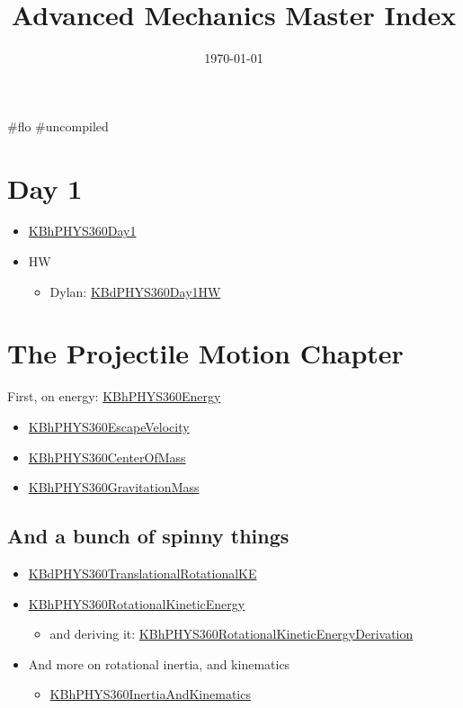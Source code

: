 \documentclass[letterpaper]{article}
\date{\today}
\title{Advanced Mechanics Master Index}
\renewcommand\maketitle{}
\begin{document}
\maketitle
\#flo \#uncompiled

\section{Day 1}
\label{sec:orgbb2db4e}
\begin{itemize}
\item \href{KBhPHYS360Day1.org}{KBhPHYS360Day1}
\item HW

\begin{itemize}
\item Dylan: \href{KBdPHYS360Day1HW.org}{KBdPHYS360Day1HW}
\end{itemize}
\end{itemize}

\section{The Projectile Motion Chapter}
\label{sec:org9dff63d}
First, on energy: \href{KBhPHYS360Energy.org}{KBhPHYS360Energy}

\begin{itemize}
\item \href{KBhPHYS360EscapeVelocity.org}{KBhPHYS360EscapeVelocity}
\item \href{KBhPHYS360CenterOfMass.org}{KBhPHYS360CenterOfMass}
\item \href{KBhPHYS360GravitationMass.org}{KBhPHYS360GravitationMass}
\end{itemize}

\subsection{And a bunch of spinny things}
\label{sec:orgbb6b897}
\begin{itemize}
\item \href{KBdPHYS360TranslationalRotationalKE.org}{KBdPHYS360TranslationalRotationalKE}
\item \href{KBhPHYS360RotationalKineticEnergy.org}{KBhPHYS360RotationalKineticEnergy}

\begin{itemize}
\item and deriving it:
\href{KBhPHYS360RotationalKineticEnergyDerivation.org}{KBhPHYS360RotationalKineticEnergyDerivation}
\end{itemize}

\item And more on rotational inertia, and kinematics

\begin{itemize}
\item \href{KBhPHYS360InertiaAndKinematics.org}{KBhPHYS360InertiaAndKinematics}
\end{itemize}
\end{itemize}
\end{document}
